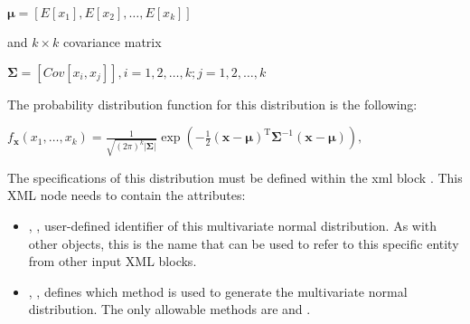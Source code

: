 $\boldsymbol\mu= [E[x_1], E[x_2], …, E[x_k]]$

and $k \times k$ covariance matrix

$\boldsymbol\Sigma = [Cov[x_i,x_j]] , i=1,2,\ldots,k ; j=1,2,\ldots,k$

The probability distribution function for this distribution is the following:

$
f_{\mathbf x}(x_1,\ldots,x_k) =
\frac{1}{\sqrt{(2\pi)^k|\boldsymbol\Sigma|}}
\exp\left(-\frac{1}{2}({\mathbf x}-{\boldsymbol\mu})^\mathrm{T}{\boldsymbol\Sigma}^{-1}({\mathbf x}-{\boldsymbol\mu})
\right),
$

The specifications of this distribution must be defined within the xml block .
This XML node needs to contain the attributes:
\vspace{-5mm}
\begin{itemize}
\itemsep0em
\item {}, , user-defined identifier of this multivariate normal distribution.
%
\nb As with other objects, this is the name that can be used to refer to this specific entity from other input XML blocks.
\item {}, , defines which method is used to generate the multivariate normal distribution. 
The only allowable methods are  and .
%
\end{itemize}
\vspace{-5mm}

